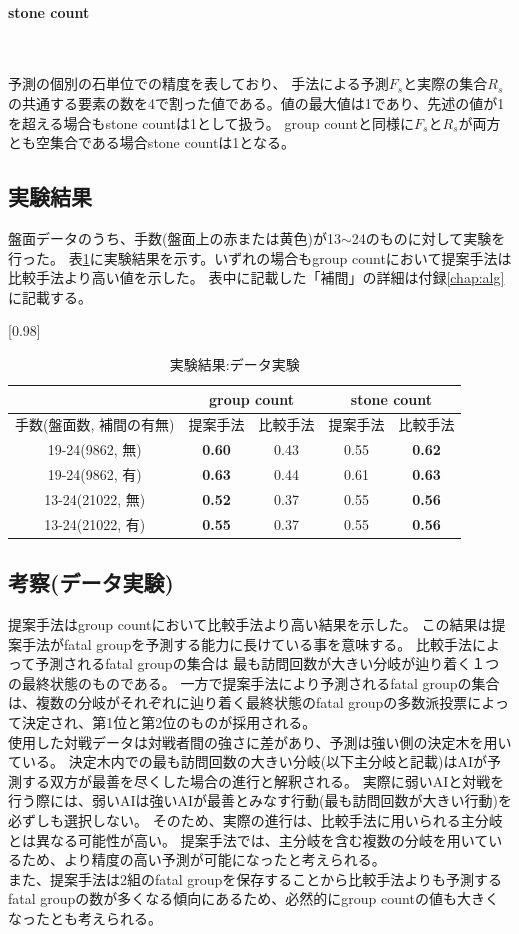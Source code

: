 \paragraph{stone count}~
\par 予測の個別の石単位での精度を表しており、
手法による予測$F_s$と実際の集合$R_s$の共通する要素の数を4で割った値である。値の最大値は1であり、先述の値が1を超える場合もstone countは1として扱う。
group countと同様に$F_s$と$R_s$が両方とも空集合である場合stone countは1となる。
\subsection{実験結果}
盤面データのうち、手数(盤面上の赤または黄色)が13$\sim$24のものに対して実験を行った。
表\ref{table:result-online}に実験結果を示す。いずれの場合もgroup countにおいて提案手法は比較手法より高い値を示した。
表中に記載した「補間」の詳細は付録\ref{chap:alg}に記載する。
\begin{table}[H]
	\caption{実験結果:データ実験}
	\centering
	\scalebox{0.98}[0.98]{
		\begin{tabular}{c|c|c|c|c}
			\multicolumn{1}{c}{} & \multicolumn{2}{|c|}{group count} 
			& \multicolumn{2}{c|}{stone count}\\ \hline \hline
			手数(盤面数, 補間の有無)    & 提案手法 & 比較手法 & 提案手法 & 比較手法 \\ \hline
			19-24(9862, 無)    & \bf{0.60} & 0.43 & 0.55 & \bf{0.62} \\
			19-24(9862, 有)    & \bf{0.63} & 0.44 & 0.61 & \bf{0.63}  \\
			13-24(21022, 無)   & \bf{0.52} & 0.37 & 0.55 & \bf{0.56}  \\
			13-24(21022, 有)   & \bf{0.55} & 0.37 & 0.55 & \bf{0.56}  \\
		\end{tabular}
	}
	\label{table:result-online}
\end{table}
\subsection{考察(データ実験)}
提案手法はgroup countにおいて比較手法より高い結果を示した。
この結果は提案手法がfatal groupを予測する能力に長けている事を意味する。
比較手法によって予測されるfatal groupの集合は
最も訪問回数が大きい分岐が辿り着く１つの最終状態のものである。
一方で提案手法により予測されるfatal groupの集合は、複数の分岐がそれぞれに辿り着く最終状態のfatal groupの多数派投票によって決定され、第1位と第2位のものが採用される。\\
使用した対戦データは対戦者間の強さに差があり、予測は強い側の決定木を用いている。
決定木内での最も訪問回数の大きい分岐(以下主分岐と記載)はAIが予測する双方が最善を尽くした場合の進行と解釈される。
実際に弱いAIと対戦を行う際には、弱いAIは強いAIが最善とみなす行動(最も訪問回数が大きい行動)を必ずしも選択しない。
そのため、実際の進行は、比較手法に用いられる主分岐とは異なる可能性が高い。
提案手法では、主分岐を含む複数の分岐を用いているため、より精度の高い予測が可能になったと考えられる。\\
また、提案手法は2組のfatal groupを保存することから比較手法よりも予測するfatal groupの数が多くなる傾向にあるため、必然的にgroup countの値も大きくなったとも考えられる。


